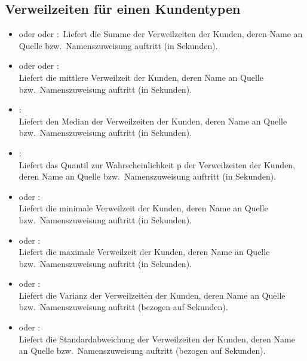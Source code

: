 \subsection{Verweilzeiten für einen Kundentypen}

\begin{itemize}

\item
{} oder  oder :\
Liefert die Summe der Verweilzeiten der Kunden, deren Name an Quelle bzw.\ Namenszuweisung  auftritt (in Sekunden).

\item
{} oder  oder :\\
Liefert die mittlere Verweilzeit der Kunden, deren Name an Quelle bzw.\ Namenszuweisung \cm{id} auftritt (in Sekunden).

\item
{}:\\
Liefert den Median der Verweilzeiten der Kunden, deren Name an Quelle bzw.\ Namenszuweisung  auftritt (in Sekunden).

\item
{}:\\
Liefert das Quantil zur Wahrscheinlichkeit p der Verweilzeiten der Kunden, deren Name an Quelle bzw.\ Namenszuweisung  auftritt (in Sekunden).

\item
{} oder :\\
Liefert die minimale Verweilzeit der Kunden, deren Name an Quelle bzw.\ Namenszuweisung  auftritt (in Sekunden).

\item
{} oder :\\
Liefert die maximale Verweilzeit der Kunden, deren Name an Quelle bzw.\ Namenszuweisung  auftritt (in Sekunden).

\item
{} oder :\\
Liefert die Varianz der Verweilzeiten der Kunden, deren Name an Quelle bzw.\ Namenszuweisung  auftritt (bezogen auf Sekunden).

\item
{} oder :\\
Liefert die Standardabweichung der Verweilzeiten der Kunden, deren Name an Quelle bzw.\ Namenszuweisung  auftritt (bezogen auf Sekunden).


\end{itemize}
